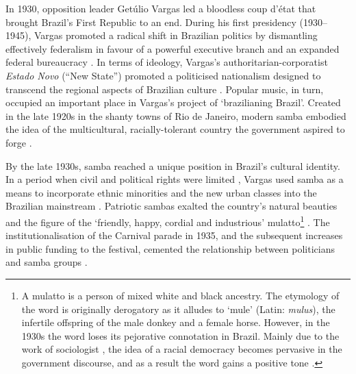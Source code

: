 In 1930, opposition leader Getúlio Vargas led a bloodless coup d'état that brought Brazil's First Republic to an end. During his first presidency (1930--1945), Vargas promoted a radical shift in Brazilian politics by dismantling effectively federalism in favour of a powerful executive branch and an expanded federal bureaucracy \citep[e.g.][]{bethell2008politicsvargas,desouza1983estado,fausto1972revoluccao,fausto2014concise,skidmore1967politics}. In terms of ideology, Vargas's authoritarian-corporatist \emph{Estado Novo} (``New State'') promoted a politicised nationalism designed to transcend the regional aspects of Brazilian culture \citep{lauerhass1972getulio,nava1998lessons,williams2001culture}. Popular music, in turn, occupied an important place in Vargas's project of `brazilianing Brazil'. Created in the late 1920s in the shanty towns of Rio de Janeiro, modern samba embodied the idea of the multicultural, racially-tolerant country the government aspired to forge \citep{avelar2011brazilian,mccann2004hello,stockler2011samba,vassberg1969villa,vassberg1975villa}.

By the late 1930s, samba reached a unique position in Brazil's cultural identity. In a period when civil and political rights were limited \citep{de2001cidadania,duarte1993vicissitudes}, Vargas used samba as a means to incorporate ethnic minorities and the new urban classes into the Brazilian mainstream \citep[213]{chinelli1993vazio}. Patriotic sambas exalted the country's natural beauties and the figure of the `friendly, happy, cordial and industrious' mulatto\footnote{A mulatto is a person of mixed white and black ancestry. The etymology of the word is originally derogatory as it alludes to `mule' (Latin: \emph{mulus}), the infertile offspring of the male donkey and a female horse. However, in the 1930s the word loses its pejorative connotation in Brazil. Mainly due to the work of sociologist \citet{freyre1933casa}, the idea of a racial democracy becomes pervasive in the government discourse, and as a result the word gains a positive tone \citep[4]{reiter2009brazil}.} \citetext{\citealp[47]{dangelo2016samba}; \citealp[51]{vianna1995misterio}}. The institutionalisation of the Carnival parade in 1935, and the subsequent increases in public funding to the festival, cemented the relationship between politicians and samba groups \citep{almeida2017carnaval,cabral2016escolas,soihet1998subversao}.

